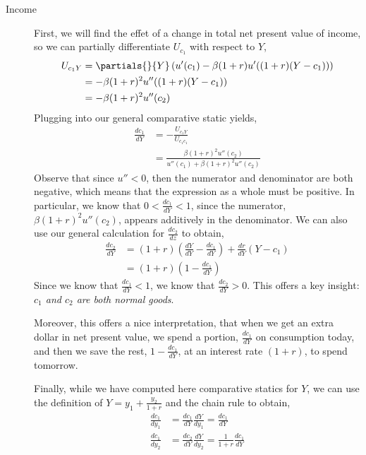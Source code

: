 \begin{description}
    \item[Income] First, we will find the effet of a change in total net present value of income, so we can partially differentiate $U_{c_1}$ with respect to $Y$,
    \begin{align*}
        U_{c_1 Y} &= \partials{}{Y} \left(u'(c_1) - \beta (1 + r) u'((1 + r)(Y - c_1))\right) \\
        &= - \beta (1 + r)^2 u''((1 + r)(Y - c_1))  \\
        &= - \beta (1 + r)^2 u''(c_2)
    \end{align*}
    Plugging into our general comparative static yields,
    \begin{align*}
        \frac{dc_1}{dY} &= - \frac{U_{c_1 Y}}{U_{c_1 c_1}} \\
        &= \frac{\beta (1 + r)^2 u''(c_2)}{u''(c_1) + \beta (1+r)^2 u''(c_2)}
    \end{align*}
    Observe that since $u'' < 0$, then the numerator and denominator are both negative, which means that the expression as a whole must be positive. In particular, we know that $0  < \frac{dc_1}{dY} < 1$, since the numerator, $\beta (1 + r)^2 u''(c_2)$, appears additively in the denominator. We can also use our general calculation for $\frac{dc_2}{dz}$ to obtain,
    \begin{align*}
        \frac{dc_2}{dY} &= (1 + r)\left(\frac{dY}{dY} - \frac{dc_1}{dY}\right) + \frac{dr}{dY}(Y - c_1) \\
        &= (1 + r) \left(1 - \frac{dc_1}{dY}\right)
    \end{align*}
    Since we know that $\frac{dc_1}{dY} < 1$, we know that $\frac{dc_2}{dY} > 0$. This offers a key insight: 
    \emph{$c_1$ and $c_2$ are both normal goods}. 

    Moreover, this offers a nice interpretation, that when we get an extra dollar in net present value, we spend a portion, $\frac{dc_1}{dY}$ on consumption today, and then we save the rest, $1 - \frac{dc_1}{dY}$, at an interest rate $(1 + r)$, to spend tomorrow. 

    Finally, while we have computed here comparative statics for $Y$, we can use the definition of $Y = y_1 + \frac{y_2}{1 + r}$ and the chain rule to obtain,
    \begin{align*}
        \frac{dc_1}{dy_1} &= \frac{dc_1}{dY} \frac{dY}{dy_1} = \frac{dc_1}{dY} \\
        \frac{dc_1}{dy_2} &= \frac{dc_2}{dY} \frac{dY}{dy_2} = \frac{1}{1 + r} \frac{dc_1}{dY}
    \end{align*}
 

\end{description}
